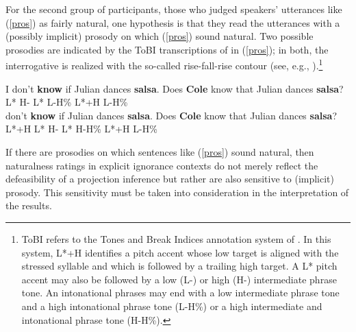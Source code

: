 \documentclass[11pt,fleqn]{article}
\newcommand{\6}{\mbox{$[\hspace*{-.6mm}[$}}
\newcommand{\9}{\mbox{$]\hspace*{-.6mm}]$}}
\begin{document}
For the second group of participants, those who judged speakers' utterances like (\ref{pros}) as fairly natural, one hypothesis is that they read the utterances with a (possibly implicit) prosody on which (\ref{pros}) sound natural.  Two possible prosodies are indicated by the ToBI transcriptions of in (\ref{pros}); in both, the interrogative is realized with the so-called rise-fall-rise contour (see, e.g., \citealt{ward-hirschberg85,buering97,buering03,wagner-etal2013}).\footnote{ToBI refers to the Tones and Break Indices annotation system of \citealt{beckman-ayers97}. In this system, L*+H identifies a pitch accent whose low target is aligned with the stressed syllable and which is followed by a trailing high target. A L* pitch accent may also be followed by a low (L-) or high (H-) intermediate phrase tone. An intonational phrases may end with a low intermediate phrase tone and a high intonational phrase tone (L-H\%) or a high intermediate and intonational phrase tone (H-H\%).}

\begin{exe}
\ex\label{pros} 
\begin{xlist}
\ex \gll I don't {\bf know} if Julian dances {\bf salsa}. Does {\bf Cole} know that Julian dances {\bf salsa}? 
\\ {} {} {L* H-} {} {} {} {L* L-H\%} {} L*+H {} {} {} {} {\hspace*{.2cm} L-H\%} \\ \glt 
\ex {} don't {\bf know} if Julian dances {\bf salsa}. Does {\bf Cole} know that Julian dances {\bf salsa}? 
\\ L*+H {} {L* H-} {} {} {} {L* H-H\%} {} L*+H {} {} {} {} {\hspace*{.2cm} L-H\%} \\ \glt 
\end{xlist}
\end{exe}
If there are prosodies on which sentences like (\ref{pros}) sound natural, then naturalness ratings in explicit ignorance contexts do not merely reflect the defeasibility of a projection inference but rather are also sensitive to (implicit) prosody. This sensitivity must be taken into consideration in the interpretation of the results.
\end{document}
